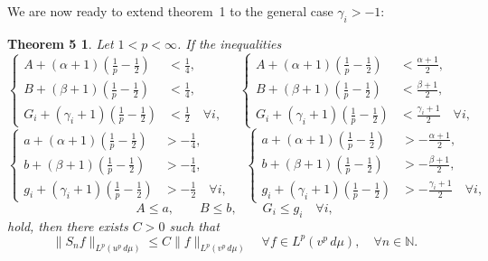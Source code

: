 \documentclass[a4paper,12pt]{article}
\theoremstyle{plain}
\newtheorem*{theoremFive}{Theorem 5}
\theoremstyle{definition}
\newcommand{\N}{\mathbb{N}}
\begin{document}
We are now ready to extend theorem~1 to the general case $\gamma_{i} > -1$:

\begin{theoremFive}
Let $1 < p < \infty$.
If the inequalities
$$
\left\{
\begin{aligned}
A + (\alpha+1) \left(\frac{1}{p} - \frac{1}{2}\right) &< \frac{1}{4}, \\
B + (\beta+1) \left(\frac{1}{p} - \frac{1}{2}\right) &< \frac{1}{4}, \\
G_{i} + (\gamma_{i}+1) \left(\frac{1}{p} - \frac{1}{2}\right) &< \frac{1}{2}
\quad \forall i,
\end{aligned}
\right.
\quad
\left\{
\begin{aligned}
A + (\alpha+1) \left(\frac{1}{p} - \frac{1}{2}\right) &< \frac{\alpha+1}{2}, \\
B + (\beta+1) \left(\frac{1}{p} - \frac{1}{2}\right) &< \frac{\beta+1}{2}, \\
G_{i} + (\gamma_{i}+1) \left(\frac{1}{p} - \frac{1}{2}\right) &< \frac{\gamma_{i}+1}{2}
\quad \forall i,
\end{aligned}
\right.
$$
$$
\left\{
\begin{aligned}
a + (\alpha+1) \left(\frac{1}{p} - \frac{1}{2}\right) &> - \frac{1}{4}, \\
b + (\beta+1) \left(\frac{1}{p} - \frac{1}{2}\right) &> - \frac{1}{4}, \\
g_{i} + (\gamma_{i}+1) \left(\frac{1}{p} - \frac{1}{2}\right) &> - \frac{1}{2}
\quad \forall i,
\end{aligned}
\right.
\quad
\left\{
\begin{aligned}
a + (\alpha+1) \left(\frac{1}{p} - \frac{1}{2}\right) &> - \frac{\alpha+1}{2}, \\
b + (\beta+1) \left(\frac{1}{p} - \frac{1}{2}\right) &> - \frac{\beta+1}{2}, \\
g_{i} + (\gamma_{i}+1) \left(\frac{1}{p} - \frac{1}{2}\right) &> - \frac{\gamma_{i}+1}{2}
\quad \forall i,
\end{aligned}
\right.
$$
$$
A \leq a, \qquad B \leq b, \qquad G_{i} \leq g_{i}
\quad \forall i,
$$
hold, then there exists $C > 0$ such that
$$
\| S_{n}f \|_{L^{p}(u^{p}\,d\mu)}
\leq C \| f \|_{L^{p}(v^{p}\,d\mu)}
\quad \forall f \in L^{p}(v^{p}\,d\mu),
\quad \forall n \in \N.
$$
\end{theoremFive}
\end{document}
